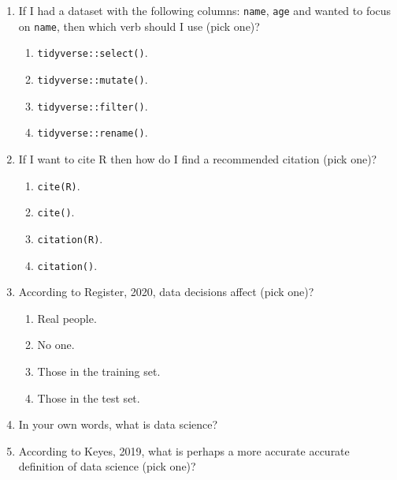 \documentclass[
]{book}
\providecommand{\tightlist}{%
  \setlength{\itemsep}{0pt}\setlength{\parskip}{0pt}}
\begin{document}
\begin{enumerate}
\def\labelenumi{\arabic{enumi}.}
\tightlist
\item
  If I had a dataset with the following columns: \texttt{name}, \texttt{age} and wanted to focus on \texttt{name}, then which verb should I use (pick one)?

  \begin{enumerate}
  \def\labelenumii{\alph{enumii}.}
  \tightlist
  \item
    \texttt{tidyverse::select()}.
  \item
    \texttt{tidyverse::mutate()}.
  \item
    \texttt{tidyverse::filter()}.
  \item
    \texttt{tidyverse::rename()}.
  \end{enumerate}
\item
  If I want to cite R then how do I find a recommended citation (pick one)?

  \begin{enumerate}
  \def\labelenumii{\alph{enumii}.}
  \tightlist
  \item
    \texttt{cite(\textquotesingle{}R\textquotesingle{})}.
  \item
    \texttt{cite()}.
  \item
    \texttt{citation(\textquotesingle{}R\textquotesingle{})}.
  \item
    \texttt{citation()}.
  \end{enumerate}
\item
  According to Register, 2020, data decisions affect (pick one)?

  \begin{enumerate}
  \def\labelenumii{\alph{enumii}.}
  \tightlist
  \item
    Real people.
  \item
    No one.
  \item
    Those in the training set.
  \item
    Those in the test set.
  \end{enumerate}
\item
  In your own words, what is data science?
\item
  According to Keyes, 2019, what is perhaps a more accurate accurate definition of data science (pick one)?


\end{enumerate}
\end{document}
